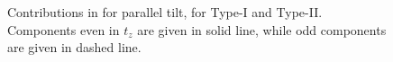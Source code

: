 \documentclass[%
 reprint,
 amsmath,amssymb,
 aps,
]{revtex4-2}
\begin{document}
\begin{figure}[p]
\caption{Contributions in for parallel tilt, for Type-I and Type-II.
  Components even in \( t_z \) are given in solid line, while odd components are given in dashed line.
}
\end{figure}
\end{document}
